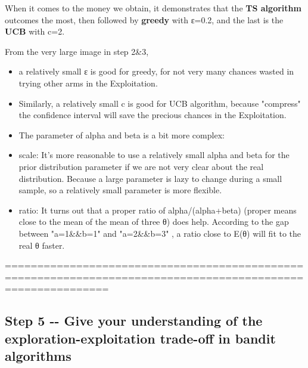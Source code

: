 \documentclass[11pt]{article}
\providecommand{\tightlist}{%
      \setlength{\itemsep}{0pt}\setlength{\parskip}{0pt}}
\begin{document}
    When it comes to the money we obtain, it demonstrates that the
\textbf{TS algorithm} outcomes the most, then followed by
\textbf{greedy} with ε=0.2, and the last is the \textbf{UCB} with c=2.

    From the very large image in step 2\&3,

\begin{itemize}
\tightlist
\item
  a relatively small ε is good for greedy, for not very many chances
  wasted in trying other arms in the Exploitation.
\item
  Similarly, a relatively small c is good for UCB algorithm, because
  "compress" the confidence interval will save the precious chances in
  the Exploitation.
\item
  The parameter of alpha and beta is a bit more complex:
\item
  scale: It's more reasonable to use a relatively small alpha and beta
  for the prior distribution parameter if we are not very clear about
  the real distribution. Because a large parameter is lazy to change
  during a small sample, so a relatively small parameter is more
  flexible.
\item
  ratio: It turns out that a proper ratio of alpha/(alpha+beta) (proper
  means close to the mean of the mean of three θ) does help. According
  to the gap between "a=1\&\&b=1" and "a=2\&\&b=3" , a ratio close to
  E(θ) will fit to the real θ faster.
\end{itemize}

    ============================================================================================================

    \subsection{Step 5 -\/- Give your understanding of the
exploration-exploitation trade-off in bandit
algorithms}\label{step-5----give-your-understanding-of-the-exploration-exploitation-trade-off-in-bandit-algorithms}
\end{document}
